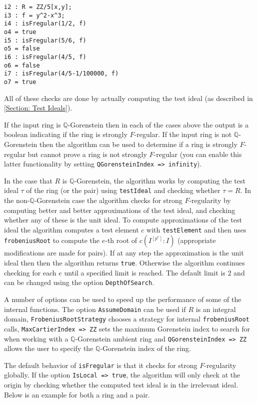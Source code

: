 \documentclass[11pt]{amsart}
\begin{document}
\begin{verbatim}
i2 : R = ZZ/5[x,y];
i3 : f = y^2-x^3;
i4 : isFregular(1/2, f)
o4 = true
i5 : isFregular(5/6, f)
o5 = false
i6 : isFregular(4/5, f)
o6 = false
i7 : isFregular(4/5-1/100000, f)
o7 = true
\end{verbatim}

All of these checks are done by actually computing the test ideal (as described in \autoref{Section: Test Ideals}).

If the input ring is $\mathbb{Q}$-Gorenstein then in each of the cases above the output is a boolean indicating if the
ring is strongly $F$-regular. If the input ring is not
$\mathbb{Q}$-Gorenstein then the algorithm can be used to determine if a
ring is strongly $F$-regular but cannot prove a ring is not strongly
$F$-regular (you can enable this latter functionality by setting {\tt QGorensteinIndex => infinity}).


In the case that $R$ is $\mathbb{Q}$-Gorenstein, the algorithm works by
computing the test ideal $\tau$ of the ring  (or the pair) using {\tt testIdeal}
and checking whether $\tau=R$.
In the non-$\mathbb{Q}$-Gorenstein case the algorithm checks for
strong $F$-regularity by computing better and
better approximations of the test ideal, and checking whether any of these is the unit ideal.
To compute approximations of the
test ideal the algorithm computes a test element $c$ with {\tt testElement}
and then uses {\tt frobeniusRoot} to compute the $e$-th root of
$c(I^{[p^{e}]} : I)$ (appropriate modifications are made for pairs). If at
any step the approximation is the unit ideal then then the algorithm
returns {\tt true}. Otherwise the algorithm continues checking for each $e$
until a specified limit is reached. The default limit is 2 and can be
changed using the option {\tt DepthOfSearch}.


A number of options can be used to speed up the performance of some of the
internal functions. The option {\tt AssumeDomain} can be used if $R$ is an
integral domain, {\tt FrobeniusRootStrategy} chooses a strategy for
internal {\tt frobeniusRoot} calls, {\tt MaxCartierIndex => ZZ} sets the
maximum Gorenstein index to search for when working with a
$\mathbb{Q}$-Gorenstein ambient ring and {\tt QGorensteinIndex => ZZ}
allows the user to specify the $\mathbb{Q}$-Gorenstein index of the ring.


The default behavior of {\tt isFregular} is that it checks for strong $F$-regularity
globally. If the option {\tt IsLocal => true}, the algorithm will only
check at the origin by checking whether the computed test ideal is in the irrelevant ideal.
Below is an example for both a ring and a pair.
\end{document}
